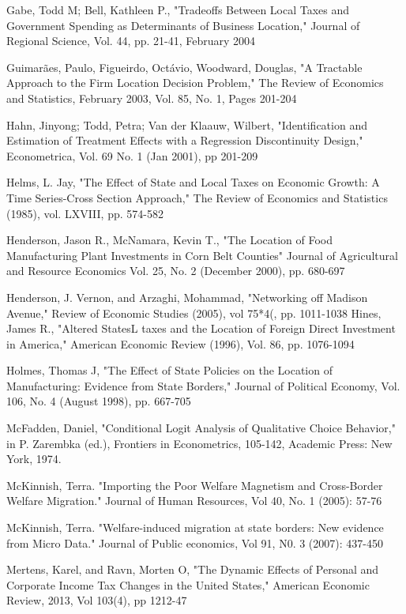 \documentclass[12pt,a4paper]{article}
\begin{document}
\begin{thebibliography}{99}
Gabe, Todd M; Bell, Kathleen P., "Tradeoffs Between Local Taxes and Government Spending as Determinants of Business Location," Journal of Regional Science, Vol. 44, pp. 21-41, February 2004 

Guimarães, Paulo, Figueirdo, Octávio, Woodward, Douglas, "A Tractable Approach to the Firm Location Decision Problem," The Review of Economics and Statistics, February 2003, Vol. 85, No. 1, Pages 201-204

Hahn, Jinyong; Todd, Petra; Van der Klaauw, Wilbert, "Identification and Estimation of Treatment Effects with a Regression Discontinuity Design," Econometrica, Vol. 69 No. 1 (Jan 2001), pp 201-209

Helms, L. Jay, "The Effect of State and Local Taxes on Economic Growth: A Time Series-Cross Section Approach," The Review of Economics and Statistics (1985), vol. LXVIII, pp. 574-582

Henderson, Jason R., McNamara, Kevin T., "The Location of Food Manufacturing Plant Investments in Corn Belt Counties" Journal of Agricultural and Resource Economics
Vol. 25, No. 2 (December 2000), pp. 680-697 

Henderson, J. Vernon, and Arzaghi, Mohammad, "Networking off Madison Avenue," Review of Economic Studies (2005), vol 75*4(, pp. 1011-1038
Hines, James R., "Altered StatesL taxes and the Location of Foreign Direct Investment in America," American Economic Review (1996), Vol. 86, pp. 1076-1094

Holmes, Thomas J, "The Effect of State Policies on the Location of Manufacturing: Evidence from State Borders," Journal of Political Economy, Vol. 106, No. 4 (August 1998), pp. 667-705

McFadden, Daniel, "Conditional Logit Analysis of Qualitative Choice Behavior," in P. Zarembka (ed.), Frontiers in Econometrics, 105-142, Academic Press: New York, 1974.

McKinnish, Terra. "Importing the Poor Welfare Magnetism and Cross-Border Welfare Migration." Journal of Human Resources, Vol 40, No. 1 (2005): 57-76

McKinnish, Terra. "Welfare-induced migration at state borders: New evidence from Micro Data." Journal of Public economics, Vol 91, N0. 3 (2007): 437-450

Mertens, Karel, and Ravn, Morten O, "The Dynamic Effects of Personal and Corporate Income Tax Changes in the United States," American Economic Review, 2013, Vol 103(4), pp 1212-47


\end{thebibliography}
\end{document}
